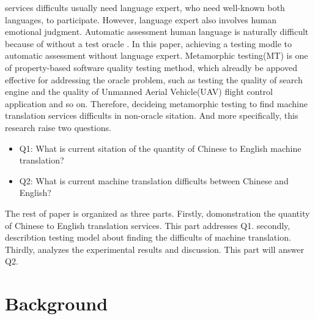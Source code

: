 \documentclass[conference]{IEEEtran}
\begin{document}
\begin{CJK*}{UTF8}{gbsn}
services difficults usually need language expert, who need well-known both languages, to
participate. However, language expert also involves human emotional judgment.
Automatic assessment human language is naturally difficult because of without a
test oracle \cite{zhou2016metamorphic}. In this paper, achieving a testing modle to automatic
assessment without language expert. Metamorphic testing(MT) is one of
property-based software quality testing method, which alreadly be appoved
effective for addressing the oracle problem, such as testing the quality of
search engine and the quality of Unmanned Aerial Vehicle(UAV) flight control
application and so on. Therefore, decideing metamorphic testing to find machine
translation services difficults in non-oracle sitation. And more specifically,
this research raise two questions.

\begin{itemize}
  \item Q1: What is current sitation of the quantity of Chinese to English
    machine translation?
  \item Q2: What is current machine translation difficults between Chinese and English?
\end{itemize}

The rest of paper is organized as three parts. Firstly, domonstration the
quantity of Chinese to English translation services. This part addresses Q1.
secondly, describtion testing model about finding the difficults of machine
translation. Thirdly, analyzes the experimental results and discussion. This part will
answer Q2.

\section{Background}

\end{CJK*}
\end{document}
